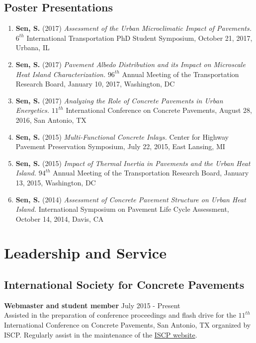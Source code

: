 \documentclass[12pt]{article}
\begin{document}
\subsection*{Poster Presentations}
\begin{enumerate}[label=(\arabic*)]
	\item \textbf{Sen, S.} (2017) \textit{Assessment of the Urban Microclimatic Impact of Pavements.} $6^{th}$ International Transportation PhD Student Symposium, October 21, 2017, Urbana, IL
	\item \textbf{Sen, S.} (2017) \textit{Pavement Albedo Distribution and its Impact on Microscale Heat Island Characterization.} $96^{th}$ Annual Meeting of the Transportation Research Board, January 10, 2017, Washington, DC
	\item \textbf{Sen, S.} (2017) \textit{Analyzing the Role of Concrete Pavements in Urban Energetics.} $11^{th}$ International Conference on Concrete Pavements, August 28, 2016, San Antonio, TX
	\item \textbf{Sen, S.} (2015) \textit{Multi-Functional Concrete Inlays.} Center for Highway Pavement Preservation Symposium, July 22, 2015, East Lansing, MI
	\item \textbf{Sen, S.} (2015) \textit{Impact of Thermal Inertia in Pavements and the Urban Heat Island.} $94^{th}$ Annual Meeting of the Transportation Research Board, January 13, 2015, Washington, DC
	\item \textbf{Sen, S.} (2014) \textit{Assessment of Concrete Pavement Structure on Urban Heat Island.} International Symposium on Pavement Life Cycle Assessment, October 14, 2014, Davis, CA
\end{enumerate}

\section*{Leadership and Service}
\subsection*{International Society for Concrete Pavements}
\textbf{Webmaster and student member} \hfill July 2015 - Present \\
Assisted in the preparation of conference proceedings and flash drive for the $11^{th}$ International Conference on Concrete Pavements, San Antonio, TX organized by ISCP. Regularly assist in the maintenance of the \href{concretepavements.org}{ISCP website}. \\
\end{document}
